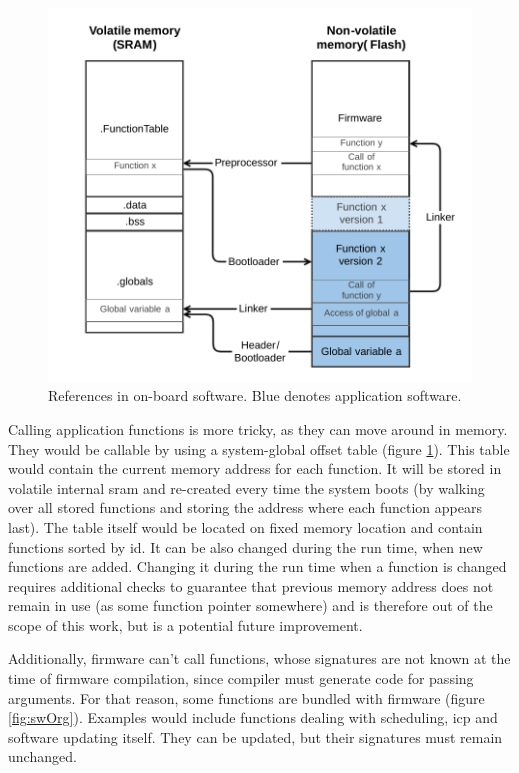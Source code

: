 \begin{figure}[t]
	\centering
	\includegraphics[width=\textwidth]{figures/Software_linking.pdf}
	\caption{References in on-board software. Blue denotes application software.}
	\label{fig:swLink}
\end{figure}

Calling application functions is more tricky, as they can move around in memory. They would be callable by using a system-global offset table (figure \ref{fig:swLink}). This table would contain the current memory address for each function. It will be stored in volatile internal \gls{sram} and re-created every time the system boots (by walking over all stored functions and storing the address where each function appears last). The table itself would be located on fixed memory location and contain functions sorted by id. It can be also changed during the run time, when new functions are added. Changing it during the run time when a function is changed requires additional checks to guarantee that previous memory address does not remain in use (as some function pointer somewhere) and is therefore out of the scope of this work, but is a potential future improvement.

Additionally, firmware can't call functions, whose signatures are not known at the time of firmware compilation, since compiler must generate code for passing arguments. For that reason, some functions are bundled with firmware (figure \ref{fig:swOrg}). Examples would include functions dealing with scheduling, \gls{icp} and software updating itself. They can be updated, but their signatures must remain unchanged.

